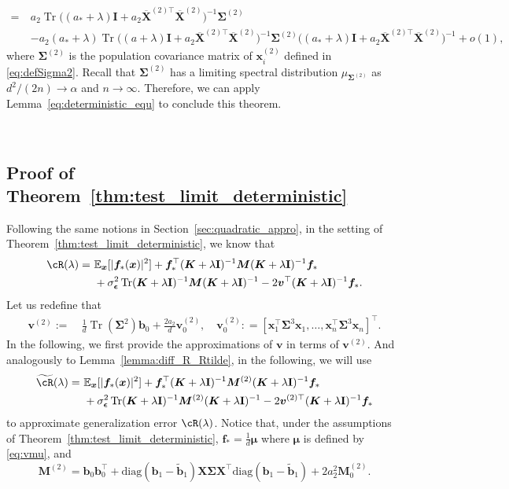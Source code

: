 \documentclass[twoside,11pt]{article}
\newcommand{\bepsilon}{\boldsymbol{\epsilon}}
\newcommand{\E}{\mathbb{E}}
\def\bI{{\mathbf I}}
\newcommand{\diag}{\text{diag}}
\def\vf{{\boldsymbol f}}
\def\bK{{\boldsymbol K}}
\def\bX{{\boldsymbol X}}
\def\bM{{\boldsymbol M}}
\def\bb{{\boldsymbol b}}
\def\bv{{\boldsymbol v}}
\def\bx{{\boldsymbol x}}
\def\bSigma{{\boldsymbol \Sigma}}
\renewcommand{\bK}{\boldsymbol{K}}
\newcommand{\Tr}{\operatorname{Tr}}
\newcommand{\vmu}{\mbi{\mu}}
\newcommand{\1}{\mathbf{1}}
\def\mbi#1{\boldsymbol{#1}}
\def\mbi#1{\boldsymbol{#1}} %
\newenvironment{proofoftheorem}[1]{\par\noindent{\bf Proof of Theorem #1\ }}{\hfill\BlackBox\\[2mm]}
\begin{document}
\begin{proofoftheorem}{\ref{thm:test_limit}}
\begin{align}
    =~&  a_2 \Tr\big((a_*+\lambda)\bI+a_2\overline\bX^{(2)\top}\overline\bX^{(2)}\big)^{-1}\bSigma^{(2)}\\
    ~&- a_2(a_*+\lambda)\Tr\big((a+\lambda)\bI+a_2\overline\bX^{(2)\top}\overline\bX^{(2)}\big)^{-1}\bSigma^{(2)} \big((a_*+\lambda)\bI+a_2\overline\bX^{(2)\top}\overline\bX^{(2)}\big)^{-1}+o(1),
\end{align} 
where \(\bSigma^{(2)}\) is the population covariance matrix of $\bx_i^{(2)}$ defined in \eqref{eq:defSigma2}. Recall that $\bSigma^{(2)}$ has a limiting spectral distribution $\mu_{\bSigma^{(2)}}$ as $d^2/(2n)\to\alpha$ and $n\to\infty$. Therefore, we can apply Lemma~\ref{eq:deterministic_equ} to conclude this theorem.
 
\end{proofoftheorem}

\subsection{Proof of Theorem~\ref{thm:test_limit_deterministic}}
Following the same notions in Section~\ref{sec:quadratic_appro}, in the setting of Theorem~\ref{thm:test_limit_deterministic}, we know that  
\begin{align}\label{eq:decomp_test_3}
    \cR(\lambda)
    =~&\E_{\bx} [|\vf_*(\bx)|^2]+ \vf_*^\top (\bK+\lambda\bI)^{-1} \bM (\bK+\lambda\bI)^{-1}\vf_*\\
    ~&+ \sigma^2_{\bepsilon} \Tr(\bK+\lambda\bI)^{-1} \bM (\bK+\lambda\bI)^{-1}   -2\bv^\top  (\bK+\lambda\bI)^{-1}\vf_* . 
\end{align}
Let us redefine that
\begin{align}
    \bv^{(2)}:=~& \frac{1}{d}\Tr(\bSigma^2) \bb_0   +\frac{2 a_2}{d}\bv^{(2)}_0,\quad
    \bv^{(2)}_0: =[\bx_1^\top\bSigma^3\bx_1,\ldots,\bx_n^\top\bSigma^3\bx_n]^\top.\label{eq:v_02}
\end{align}
In the following, we first provide the approximations of $\bv$ in terms of $\bv^{(2)}$. And analogously to Lemma~\ref{lemma:diff_R_Rtilde}, in the following, we will use 
\begin{align}\label{eq:decomp_test_3_appro}
   \widetilde \cR(\lambda)
    =~&\E_{\bx} [|\vf_*(\bx)|^2]+ \vf_*^\top (\bK+\lambda\bI)^{-1} \bM^{(2)}(\bK+\lambda\bI)^{-1}\vf_*\\
    ~&+ \sigma^2_{\bepsilon} \Tr(\bK+\lambda\bI)^{-1} \bM^{(2)} (\bK+\lambda\bI)^{-1}   -2\bv^{(2)\top}  (\bK+\lambda\bI)^{-1}\vf_*
\end{align}
to approximate generalization error $\cR(\lambda)$. 
Notice that, under the assumptions of Theorem~\ref{thm:test_limit_deterministic}, $\vf_*=\frac{1}{d}\vmu$ where $\vmu$ is defined by \eqref{eq:vmu}, and 
\[\bM^{(2)} = \bb_0\bb_0^\top+\diag(\bb_1-\widetilde\bb_1)\bX\bSigma\bX^\top\diag(\bb_1-\widetilde\bb_1)+2a_2^2\bM_0^{(2)}.\]
\end{document}

